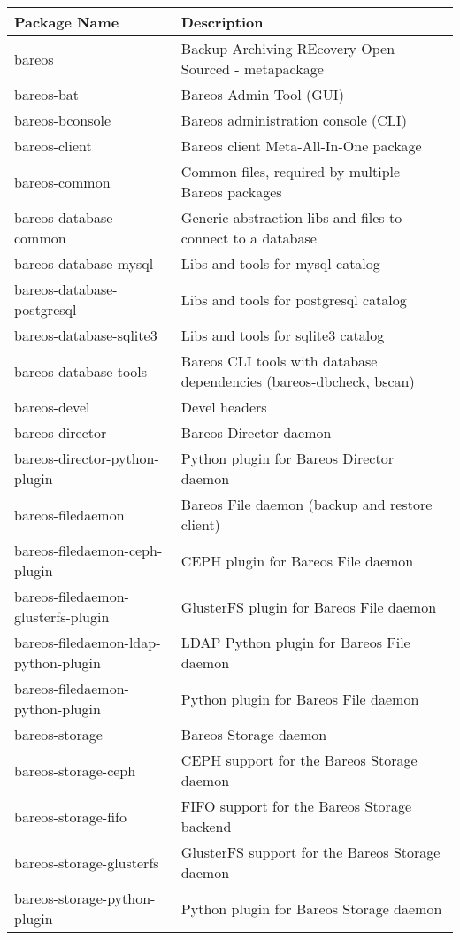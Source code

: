 \begin{center}
\begin{tabular}{ | l | l | }
\hline
\textbf{Package Name} & \textbf{Description} \\
\hline
bareos & Backup Archiving REcovery Open Sourced - metapackage \\
bareos-bat & Bareos Admin Tool (GUI) \\
bareos-bconsole & Bareos administration console (CLI) \\
bareos-client & Bareos client Meta-All-In-One package \\
bareos-common & Common files, required by multiple Bareos packages \\
bareos-database-common & Generic abstraction libs and files to connect to a database \\
bareos-database-mysql & Libs and tools for mysql catalog \\
bareos-database-postgresql & Libs and tools for postgresql catalog \\
bareos-database-sqlite3 & Libs and tools for sqlite3 catalog \\
bareos-database-tools & Bareos CLI tools with database dependencies (bareos-dbcheck, bscan) \\
bareos-devel & Devel headers \\
bareos-director & Bareos Director daemon \\
bareos-director-python-plugin & Python plugin for Bareos Director daemon \\
bareos-filedaemon & Bareos File daemon (backup and restore client) \\
bareos-filedaemon-ceph-plugin & CEPH plugin for Bareos File daemon \\
bareos-filedaemon-glusterfs-plugin & GlusterFS plugin for Bareos File daemon \\
bareos-filedaemon-ldap-python-plugin & LDAP Python plugin for Bareos File daemon \\
bareos-filedaemon-python-plugin & Python plugin for Bareos File daemon \\
bareos-storage & Bareos Storage daemon \\
bareos-storage-ceph & CEPH support for the Bareos Storage daemon \\
bareos-storage-fifo & FIFO support for the Bareos Storage backend \\
bareos-storage-glusterfs & GlusterFS support for the Bareos Storage daemon \\
bareos-storage-python-plugin & Python plugin for Bareos Storage daemon \\

\end{tabular}
\end{center}
